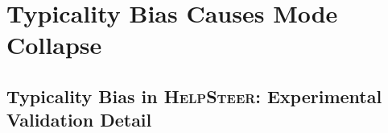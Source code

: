 




\section{Typicality Bias Causes Mode Collapse}\label{appendix:additional_proof}

\subsection{Typicality Bias in \textsc{HelpSteer}: Experimental Validation Detail}
\label{app:evidence-controls}











